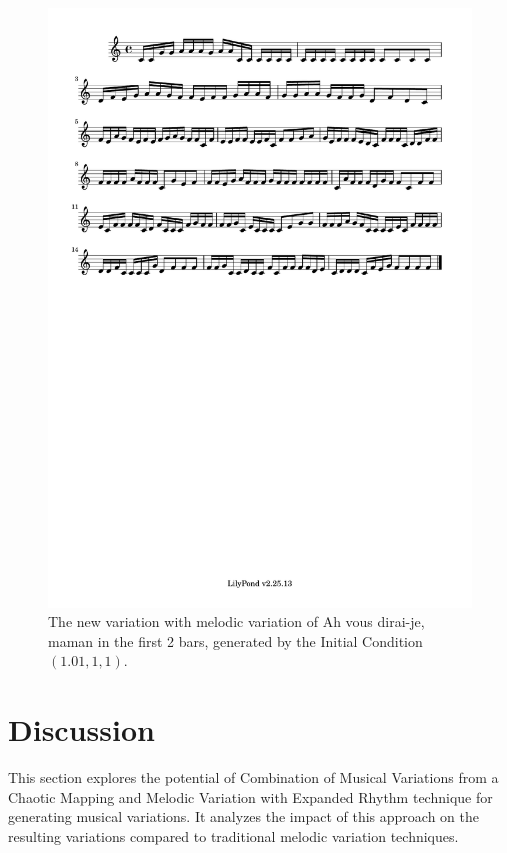 \documentclass[11pt]{article}
\begin{document}
\begin{figure}
\centering
\includegraphics[trim=1cm 26.5cm 1cm 0.5cm, clip, scale=0.6]{dabby_melody_variation.pdf}
\caption{The new variation with melodic variation of Ah vous dirai-je, maman in the first 2 bars, generated by the Initial Condition $(1.01, 1, 1)$.} 
\label{fig:MVDabby}
\end{figure}

\section{Discussion}

This section explores the potential of Combination of Musical Variations from a Chaotic Mapping and Melodic Variation with Expanded Rhythm technique for generating musical variations. It analyzes the impact of this approach on the resulting variations compared to traditional melodic variation techniques. 
\end{document}
